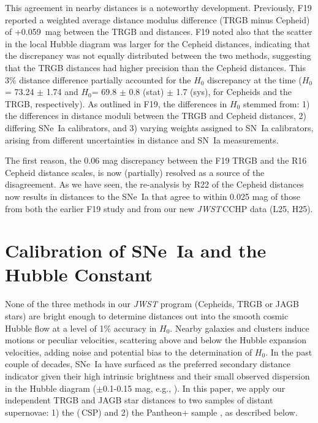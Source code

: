 \documentclass[12pt,modern]{aastex631}
\newcommand{\cchp}{\,CCHP\xspace}
\newcommand{\csp}{\,CSP\xspace}
\newcommand{\ho}{$H_{0}$\xspace}
\newcommand{\jwst}{\emph{JWST}\xspace}
\newcommand{\sne}{SNe~Ia\xspace}
\newcommand{\sn}{SN~Ia\xspace}
\begin{document}
This agreement in nearby distances is a noteworthy development. Previously, F19 reported a weighted average distance modulus difference (TRGB minus Cepheid) of +0.059~mag between the TRGB and \citet{riess_2019} distances. F19 noted also that the scatter in the local Hubble diagram was larger for the Cepheid distances, indicating that the discrepancy was not equally distributed between the two methods, suggesting that the TRGB distances had higher precision than the Cepheid distances. This 3\% distance difference partially accounted for the  \ho discrepancy at the time (\ho = 73.24 $\pm$ 1.74 and \ho = 69.8 $\pm$ 0.8 (stat) $\pm$ 1.7 (sys), for Cepheids and the TRGB, respectively). As outlined in F19, the differences in \ho stemmed from: 1) the differences in distance moduli between the TRGB and Cepheid distances, 2) differing \sne calibrators, and 3) varying weights assigned to  \sn calibrators, arising from different uncertainties in distance and \sn measurements.


The first reason, the 0.06 mag discrepancy between the F19 TRGB and the R16 Cepheid distance scales, is now (partially) resolved as a source of the disagreement. As we have seen, the re-analysis by R22 of the Cepheid distances now results in distances to the \sne that agree to within 0.025 mag of those from both the earlier F19 study and from our new \jwst \cchp data (L25, H25). 






\section{Calibration of \sne and the Hubble Constant}
\label{sec:h0}

None of the three methods  in our \jwst program (Cepheids, TRGB or JAGB stars) are  bright enough to  determine distances out into the smooth cosmic Hubble flow at a level of 1\% accuracy in \ho. Nearby galaxies and clusters induce motions  or peculiar velocities, scattering above and below the Hubble expansion velocities, adding noise and potential bias to the determination of \ho.  In the past couple of decades, \sne have surfaced as the preferred secondary distance indicator given their high intrinsic brightness and their small observed dispersion in the Hubble diagram ($\pm$0.1-0.15 mag, e.g., \citep{burns_2018, scolnic_2022,brout_2022}). In this paper, we apply our independent  TRGB and JAGB star distances to two samples of distant supernovae: 1) the (\csp) \citep{uddin_2024} and 2) the Pantheon+ sample \citep{scolnic_2022}, as described below. 
\end{document}
